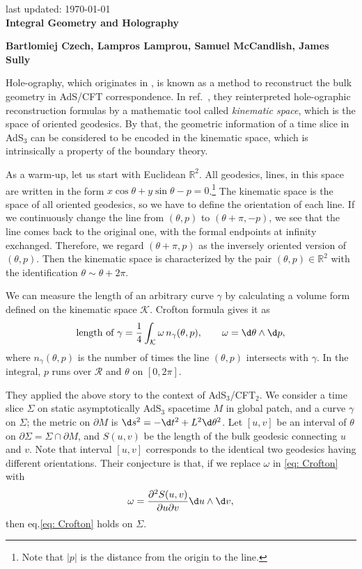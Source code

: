 \documentclass[12pt]{article}
\date{}
\renewcommand{\thefootnote}{\fnsymbol{footnote}}
\begin{document}
{\Large{}
\hfill{\normalsize last updated: \today}
\\[2mm]
\textbf{Integral Geometry and Holography\cite{Czech:2015qta}
}
}

\noindent
\hfill
\textbf{Bartlomiej Czech, Lampros Lamprou, Samuel McCandlish, James Sully}%

\renewcommand{\thefootnote}{\arabic{footnote})}
\setcounter{footnote}{0}
\vspace{12pt}
Hole-ography, which originates in \cite{Balasubramanian:2013lsa}, is known as a method to reconstruct the bulk geometry in AdS/CFT correspondence.
In ref.\ \cite{Czech:2015qta}, they reinterpreted hole-ographic reconstruction formulas by a mathematic tool called \textit{kinematic space}, which is the space of oriented geodesics.
By that, the geometric information of a time slice in AdS$_3$ can be considered to be encoded in the kinematic space, which is intrinsically a property of the boundary theory.

As a warm-up, let us start with Euclidean $\mathbb R^2$.
All geodesics, lines, in this space are written in the form $x\cos \theta + y\sin\theta - p = 0$.\footnote{
Note that $|p|$ is the distance from the origin to the line.
}
The kinematic space is the space of all oriented geodesics, so we have to define the orientation of each line.
If we continuously change the line from $(\theta,p)$ to $(\theta+\pi,-p)$, we see that the line comes back to the original one, with the formal endpoints at infinity exchanged.
Therefore, we regard $(\theta+\pi,p)$ as the inversely oriented version of $(\theta,p)$.
Then the kinematic space is characterized by the pair $(\theta,p)\in \mathbb R^2$ with the identification $\theta\sim \theta + 2\pi$.

We can measure the length of an arbitrary curve $\gamma$ by calculating a volume form defined on the kinematic space $\mathcal K$.
Crofton formula gives it as
\begin{align}
	\mbox{length of $\gamma$}=\frac{1}{4}\int_{\mathcal K}\omega\,n_\gamma(\theta,p),\qquad
	\omega = \d\theta\wedge \d p,
	\label{eq: Crofton}
\end{align}
where $n_\gamma(\theta,p)$ is the number of times the line $(\theta,p)$ intersects with $\gamma$.
In the integral, $p$ runs over $\mathcal R$ and $\theta$ on $[0,2\pi]$.

They applied the above story to the context of AdS$_3$/CFT$_2$.
We consider a time slice $\Sigma$ on static asymptotically AdS$_3$ spacetime $M$ in global patch, and a curve $\gamma$ on $\Sigma$; the metric on $\partial M$ is $\d s^2 = -\d t^2 + L^2\d\theta^2$.
Let $[u,v]$ be an interval of $\theta$ on $\partial \Sigma = \Sigma\cap \partial M$, and $S(u,v)$ be the length of the bulk geodesic connecting $u$ and $v$.
Note that interval $[u,v]$ corresponds to the identical two geodesics having different orientations.
Their conjecture is that, if we replace $\omega$ in \eqref{eq: Crofton} with
\begin{align}
	\omega = \frac{\partial^2 S(u,v)}{\partial u\partial v}\d u\wedge \d v,
\end{align}
then eq.\eqref{eq: Crofton} holds on $\Sigma$.
\end{document}
